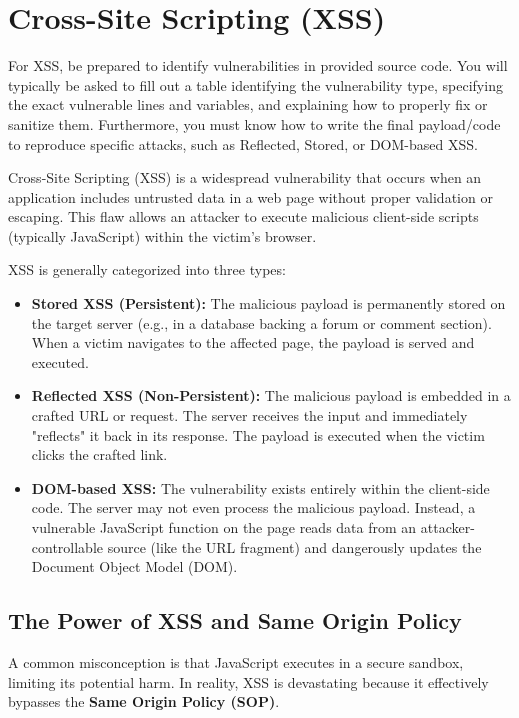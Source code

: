 \section{Cross-Site Scripting (XSS)}
\begin{tcolorbox}[colback=blue!5!white,colframe=blue!75!black,title=Exam Insight]
For XSS, be prepared to identify vulnerabilities in provided source code. You will typically be asked to fill out a table identifying the vulnerability type, specifying the exact vulnerable lines and variables, and explaining how to properly fix or sanitize them. Furthermore, you must know how to write the final payload/code to reproduce specific attacks, such as Reflected, Stored, or DOM-based XSS.
\end{tcolorbox}
Cross-Site Scripting (XSS) is a widespread vulnerability that occurs when an application includes untrusted data in a web page without proper validation or escaping. This flaw allows an attacker to execute malicious client-side scripts (typically JavaScript) within the victim's browser.

XSS is generally categorized into three types:
\begin{itemize}
    \item \textbf{Stored XSS (Persistent):} The malicious payload is permanently stored on the target server (e.g., in a database backing a forum or comment section). When a victim navigates to the affected page, the payload is served and executed.
    \item \textbf{Reflected XSS (Non-Persistent):} The malicious payload is embedded in a crafted URL or request. The server receives the input and immediately "reflects" it back in its response. The payload is executed when the victim clicks the crafted link.
    \item \textbf{DOM-based XSS:} The vulnerability exists entirely within the client-side code. The server may not even process the malicious payload. Instead, a vulnerable JavaScript function on the page reads data from an attacker-controllable source (like the URL fragment) and dangerously updates the Document Object Model (DOM).
\end{itemize}

\subsection{The Power of XSS and Same Origin Policy}
A common misconception is that JavaScript executes in a secure sandbox, limiting its potential harm. In reality, XSS is devastating because it effectively bypasses the \textbf{Same Origin Policy (SOP)}.

